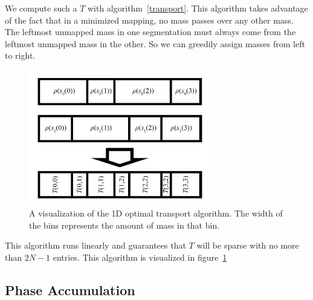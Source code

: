 \documentclass[12pt]{article}
\begin{document}
We compute such a $T$ with algorithm~\ref{transport}.
This algorithm takes advantage of the fact that in a minimized mapping, no mass passes over any other mass.
The leftmost unmapped mass in one segmentation must always come from the leftmost unmapped mass in the other.
So we can greedily assign masses from left to right.

\begin{figure}[!h]
  \begin{center}
  \includegraphics[width=0.7\textwidth]{figures/TransportDiagram}
  \caption{A visualization of the 1D optimal transport algorithm.
  The width of the bins represents the amount of mass in that bin.}
  \label{fig:optimaltransport}
\end{center}
\end{figure}

This algorithm runs linearly and guarantees that $T$ will be sparse with no more than $2N - 1$ entries.
This algorithm is visualized in figure~\ref{fig:optimaltransport}



\subsection{Phase Accumulation}
\end{document}
